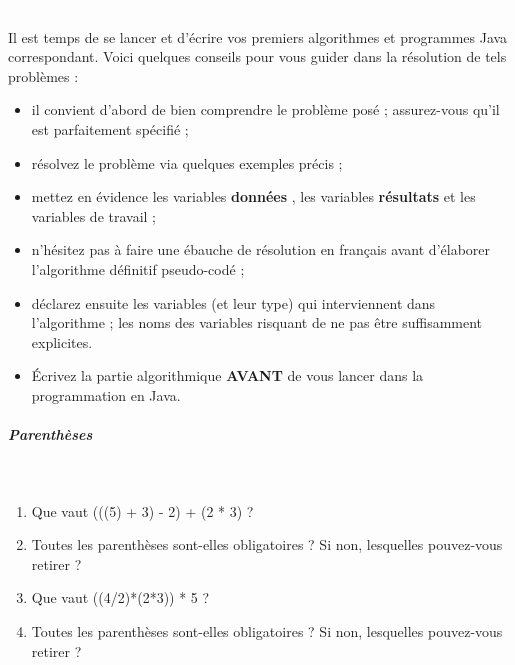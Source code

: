 \documentclass[11pt,a4paper]{article}
\begin{document}
					\textcolor{white}{.} \par
				
          Il est temps de se lancer et d'\'ecrire vos premiers algorithmes et programmes Java correspondant. 
          Voici quelques conseils pour vous guider dans la r\'esolution de tels probl\`emes :
          
					\begin{itemize}
				
			\item il convient d'abord de bien comprendre le probl\`eme pos\'e ; assurez-vous qu'il est parfaitement sp\'ecifi\'e ;
			\item r\'esolvez le probl\`eme via quelques exemples pr\'ecis ;
			\item mettez en \'evidence les variables \textbf{\guillemotleft  donn\'ees \guillemotright }, les variables \textbf{\guillemotleft  r\'esultats \guillemotright } et les variables de travail ;
			\item n'h\'esitez pas \`a faire une \'ebauche de r\'esolution en fran\c cais avant d'\'elaborer l'algorithme d\'efinitif pseudo-cod\'e ;
			\item d\'eclarez ensuite les variables (et leur type) qui interviennent dans l'algorithme ; les noms des variables risquant de ne pas \^etre suffisamment explicites.
			\item \'Ecrivez la partie algorithmique \textbf{AVANT} de vous lancer dans la programmation en Java.
					\end{itemize}
				
            \par
        
			
		\subparagraph{Parenth\`eses} 
		
					\textcolor{white}{.} \par
				
					\begin{enumerate}
				
			\item Que vaut (((5) + 3) - 2) + (2 * 3) ?
			\item Toutes les parenth\`eses sont-elles obligatoires ? Si non, lesquelles pouvez-vous retirer ?
			\item Que vaut ((4/2)*(2*3)) * 5 ?
			\item Toutes les parenth\`eses sont-elles obligatoires ? Si non, lesquelles pouvez-vous retirer ?
					\end{enumerate}
				
            \par
        
\end{document}
